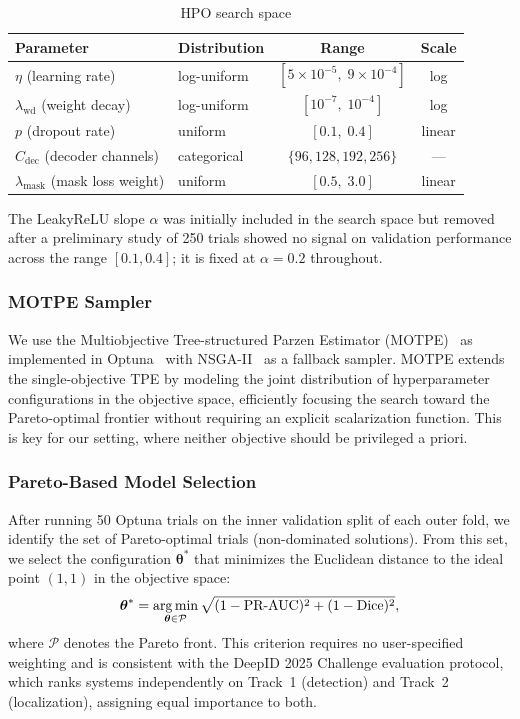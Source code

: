 \begin{table}[!t]
  \centering
  \caption{HPO search space}
  \label{tab:hpo_space}
  \begin{tabular}{llcc}
    \toprule
    Parameter & Distribution & Range & Scale \\
    \midrule
    $\eta$ (learning rate) & log-uniform & $[5\times10^{-5},\; 9\times10^{-4}]$ & log \\
    $\lambda_{\text{wd}}$ (weight decay) & log-uniform & $[10^{-7},\; 10^{-4}]$ & log \\
    $p$ (dropout rate) & uniform & $[0.1,\; 0.4]$ & linear \\
    $C_{\text{dec}}$ (decoder channels) & categorical & $\{96, 128, 192, 256\}$ & — \\
    $\lambda_{\text{mask}}$ (mask loss weight) & uniform & $[0.5,\; 3.0]$ & linear \\
    \bottomrule
  \end{tabular}
\end{table}

The LeakyReLU slope $\alpha$ was initially included in the search space but removed
after a preliminary study of 250 trials showed no signal on validation performance
across the range $[0.1, 0.4]$; it is fixed at $\alpha = 0.2$ throughout.

\subsubsection{MOTPE Sampler}

We use the Multiobjective Tree-structured Parzen Estimator
(MOTPE)~\cite{motpe2022} as implemented in Optuna~\cite{optuna2019} with NSGA-II~\cite{nsga2_2002}
as a fallback sampler. MOTPE extends the single-objective TPE by modeling
the joint distribution of hyperparameter configurations in the objective space,
efficiently focusing the search toward the Pareto-optimal frontier without
requiring an explicit scalarization function. This is key for our setting, where
neither objective should be privileged a priori.

\subsubsection{Pareto-Based Model Selection}

After running 50 Optuna trials on the inner validation split of each outer fold,
we identify the set of Pareto-optimal trials (non-dominated solutions). From this
set, we select the configuration $\boldsymbol{\theta}^*$ that minimizes the
Euclidean distance to the ideal point $(1, 1)$ in the objective space:
\begin{equation}
  \boldsymbol{\theta}^* = \operatorname*{arg\,min}_{\boldsymbol{\theta} \in \mathcal{P}}
    \sqrt{(1 - \text{PR-AUC})^2 + (1 - \text{Dice})^2},
  \label{eq:ideal_point}
\end{equation}
where $\mathcal{P}$ denotes the Pareto front. This criterion requires no
user-specified weighting and is consistent with the DeepID 2025 Challenge
evaluation protocol, which ranks systems independently on Track~1 (detection)
and Track~2 (localization), assigning equal importance to both.

